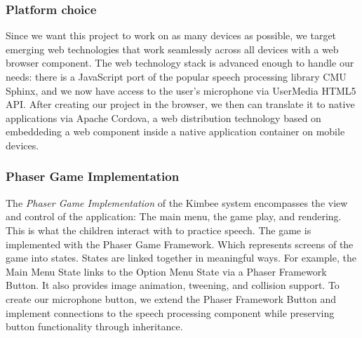 \documentclass{sig-alternate-2013}
\begin{document}
\subsubsection{Platform choice}
Since we want this project to work on as many devices as possible, we target emerging web technologies that work seamlessly across all devices with a web browser component. The web technology stack is advanced enough to handle our needs: there is a JavaScript port of the popular speech processing library CMU Sphinx, and we now have access to the user's microphone via UserMedia HTML5 API. After creating our project in the browser, we then can translate it to native applications via Apache Cordova, a web distribution technology based on embeddeding a web component inside a native application container on mobile devices.

\subsubsection{Phaser Game Implementation}
The {\em Phaser Game Implementation} of the Kimbee system encompasses the view and control of the application: The main menu, the game play, and rendering. This is what the children interact with to practice speech. The game is implemented with the Phaser Game Framework. Which represents screens of the game into states. States are linked together in meaningful ways. For example, the Main Menu State links to the Option Menu State via a Phaser Framework Button. It also provides image animation, tweening, and collision support. To create our microphone button, we extend the Phaser Framework Button and implement connections to the speech processing component while preserving button functionality through inheritance.
\end{document}
